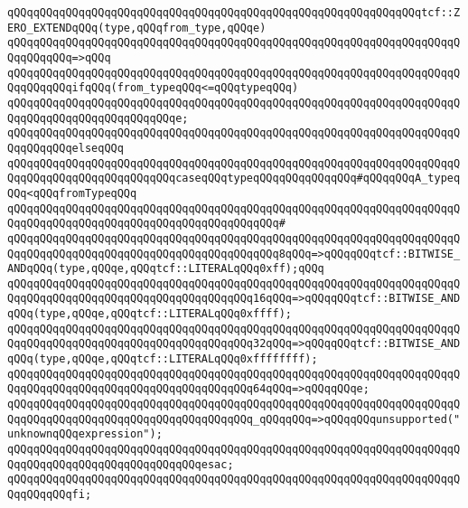 \verb|qQQqqQQqqQQqqQQqqQQqqQQqqQQqqQQqqQQqqQQqqQQqqQQqqQQqqQQqqQQqqQQqtcf::ZERO_EXTENDqQQq(type,qQQqfrom_type,qQQqe)|\newline
\verb|qQQqqQQqqQQqqQQqqQQqqQQqqQQqqQQqqQQqqQQqqQQqqQQqqQQqqQQqqQQqqQQqqQQqqQQqqQQqqQQq=>qQQq|\newline
\verb|qQQqqQQqqQQqqQQqqQQqqQQqqQQqqQQqqQQqqQQqqQQqqQQqqQQqqQQqqQQqqQQqqQQqqQQqqQQqqQQqifqQQq(from_typeqQQq<=qQQqtypeqQQq)|\newline
\verb|qQQqqQQqqQQqqQQqqQQqqQQqqQQqqQQqqQQqqQQqqQQqqQQqqQQqqQQqqQQqqQQqqQQqqQQqqQQqqQQqqQQqqQQqqQQqqQQqe;|\newline
\verb|qQQqqQQqqQQqqQQqqQQqqQQqqQQqqQQqqQQqqQQqqQQqqQQqqQQqqQQqqQQqqQQqqQQqqQQqqQQqqQQqelseqQQq|\newline
\verb|qQQqqQQqqQQqqQQqqQQqqQQqqQQqqQQqqQQqqQQqqQQqqQQqqQQqqQQqqQQqqQQqqQQqqQQqqQQqqQQqqQQqqQQqqQQqqQQqcaseqQQqtypeqQQqqQQqqQQqqQQq#qQQqqQQqA_typeqQQq<qQQqfromTypeqQQq|\newline
\verb|qQQqqQQqqQQqqQQqqQQqqQQqqQQqqQQqqQQqqQQqqQQqqQQqqQQqqQQqqQQqqQQqqQQqqQQqqQQqqQQqqQQqqQQqqQQqqQQqqQQqqQQqqQQqqQQq#|\newline
\verb|qQQqqQQqqQQqqQQqqQQqqQQqqQQqqQQqqQQqqQQqqQQqqQQqqQQqqQQqqQQqqQQqqQQqqQQqqQQqqQQqqQQqqQQqqQQqqQQqqQQqqQQqqQQqqQQq8qQQq=>qQQqqQQqtcf::BITWISE_ANDqQQq(type,qQQqe,qQQqtcf::LITERALqQQq0xff);qQQq|\newline
\verb|qQQqqQQqqQQqqQQqqQQqqQQqqQQqqQQqqQQqqQQqqQQqqQQqqQQqqQQqqQQqqQQqqQQqqQQqqQQqqQQqqQQqqQQqqQQqqQQqqQQqqQQqqQQq16qQQq=>qQQqqQQqtcf::BITWISE_ANDqQQq(type,qQQqe,qQQqtcf::LITERALqQQq0xffff);|\newline
\verb|qQQqqQQqqQQqqQQqqQQqqQQqqQQqqQQqqQQqqQQqqQQqqQQqqQQqqQQqqQQqqQQqqQQqqQQqqQQqqQQqqQQqqQQqqQQqqQQqqQQqqQQqqQQq32qQQq=>qQQqqQQqtcf::BITWISE_ANDqQQq(type,qQQqe,qQQqtcf::LITERALqQQq0xffffffff);|\newline
\verb|qQQqqQQqqQQqqQQqqQQqqQQqqQQqqQQqqQQqqQQqqQQqqQQqqQQqqQQqqQQqqQQqqQQqqQQqqQQqqQQqqQQqqQQqqQQqqQQqqQQqqQQqqQQq64qQQq=>qQQqqQQqe;|\newline
\verb|qQQqqQQqqQQqqQQqqQQqqQQqqQQqqQQqqQQqqQQqqQQqqQQqqQQqqQQqqQQqqQQqqQQqqQQqqQQqqQQqqQQqqQQqqQQqqQQqqQQqqQQqqQQq_qQQqqQQq=>qQQqqQQqunsupported("unknownqQQqexpression");|\newline
\verb|qQQqqQQqqQQqqQQqqQQqqQQqqQQqqQQqqQQqqQQqqQQqqQQqqQQqqQQqqQQqqQQqqQQqqQQqqQQqqQQqqQQqqQQqqQQqqQQqqQQqesac;|\newline
\verb|qQQqqQQqqQQqqQQqqQQqqQQqqQQqqQQqqQQqqQQqqQQqqQQqqQQqqQQqqQQqqQQqqQQqqQQqqQQqqQQqfi;|\newline
\newline
